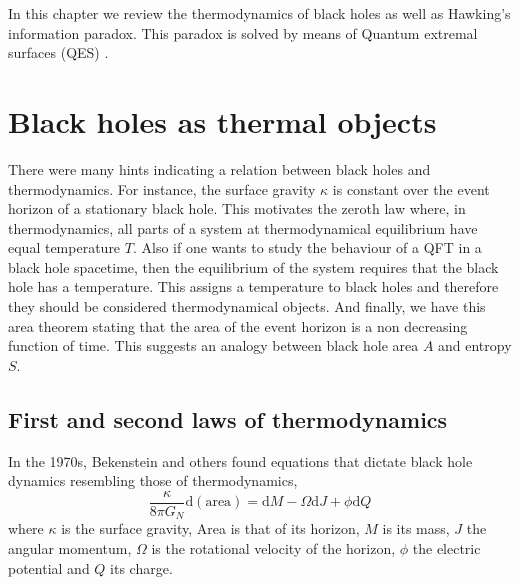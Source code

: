 In this chapter we review the thermodynamics of black holes as well as Hawking's information paradox. This paradox is solved by means of Quantum extremal surfaces (QES) \cite{almheiri2020entropy}.

\section{Black holes as thermal objects}

There were many hints indicating a relation between black holes and thermodynamics. For instance, the surface gravity $\kappa$ is constant over the event horizon of a stationary black hole. This motivates the zeroth law where, in thermodynamics, all parts of a system at thermodynamical equilibrium have equal temperature $T$. Also if one wants to study the behaviour of a QFT in a black hole spacetime, then the equilibrium of the system requires that the black hole has a temperature. This assigns a temperature to black holes and therefore they should be considered thermodynamical objects. And finally, we have this area theorem stating that the area of the event horizon is a non decreasing function of time. This suggests an analogy between black hole area $A$ and entropy $S$.

\subsection{First and second laws of thermodynamics}

In the 1970s, Bekenstein and others \cite{PhysRevD.7.2333, Bekenstein1972, PhysRevLett.25.1596} found equations that dictate black hole dynamics resembling those of thermodynamics,
\begin{equation}\label{1st law v1}
    \frac{\kappa}{8\pi G_N}\text{d}\left(\text{area}\right) = \text{d}M -\Omega\text{d}J + \phi\text{d}Q
\end{equation}
where $\kappa$ is the surface gravity, Area is that of its horizon, $M$ is its mass, $J$ the angular momentum, $\Omega$ is the rotational velocity of the horizon, $\phi$ the electric potential and $Q$ its charge.

